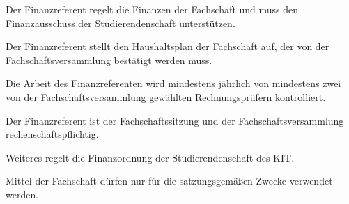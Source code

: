 \documentclass[a4paper,parskip=half,numbers=noenddot]{scrartcl}
\begin{document}
\begin{contract}
Der Finanzreferent regelt die Finanzen der Fachschaft und muss den Finanzausschuss der Studierendenschaft unterstützen.

Der Finanzreferent stellt den Haushaltsplan der Fachschaft auf, der von der Fachschaftsversammlung bestätigt werden muss.

Die Arbeit des Finanzreferenten wird mindestens jährlich von mindestens zwei von der Fachschaftsversammlung gewählten Rechnungsprüfern kontrolliert.

Der Finanzreferent ist der Fachschaftssitzung und der Fachschaftsversammlung rechen\-schafts\-pflichtig.

Weiteres regelt die Finanzordnung der Studierendenschaft des KIT.

Mittel der Fachschaft dürfen nur für die satzungsgemäßen Zwecke verwendet werden.



\end{contract}
\end{document}
